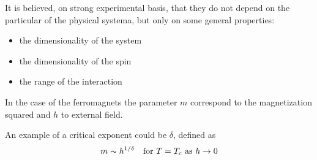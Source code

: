 \documentclass{beamer}
\begin{document}
\begin{frame}

It is believed, on strong experimental basis, that they do not depend on the
particular of the physical systema, but only on some general properties:
\begin{itemize}
\item the dimensionality of the system
\item the dimensionality of the spin
\item the range of the interaction
\end{itemize}

\vspace{5mm}
In the case of the ferromagnets the parameter $m$ correspond to the magnetization
squared and $h$ to external field.

\vspace{2mm}

An example of a critical exponent could be $\delta$, defined as
\begin{equation*}
m \thicksim h^{1/\delta} \quad \text{for}\ T = T_c\ \text{as}\ h \rightarrow 0
\end{equation*}

\end{frame}
\end{document}
